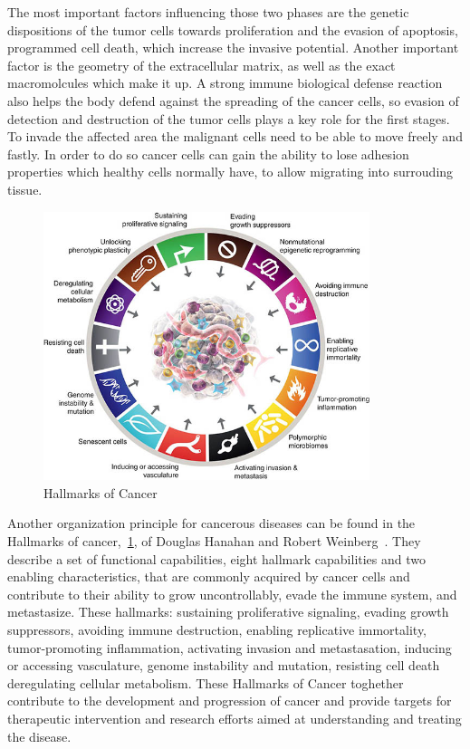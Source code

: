 The most important factors influencing those two phases are the genetic dispositions of the tumor cells towards proliferation and the evasion of apoptosis, programmed cell death, which increase the invasive potential. Another important factor is the geometry of the extracellular matrix, as well as the exact macromolcules which make it up. A strong immune biological defense reaction also helps the body defend against the spreading of the cancer cells, so evasion of detection and destruction of the tumor cells plays a key role for the first stages. To invade the affected area the malignant cells need to be able to move freely and fastly. In order to do so cancer cells can gain the ability to lose adhesion properties which healthy cells normally have, to allow migrating into surrouding tissue. 
\begin{figure}[h]
    \centering
    \includegraphics[width=0.85\textwidth]{resources/images/Hallmarks-of-Cancer.jpg}
    \caption{Hallmarks of Cancer}
    \label{fig:hallmarks_of_cancer}
\end{figure}
Another organization principle for cancerous diseases can be found in the Hallmarks of cancer,~\ref{fig:hallmarks_of_cancer}, of Douglas Hanahan and Robert Weinberg~\cite{10.1158/2159-8290.CD-21-1059}. They describe a set of functional capabilities, eight hallmark capabilities and two enabling characteristics, that are commonly acquired by cancer cells and contribute to their ability to grow uncontrollably, evade the immune system, and metastasize. These hallmarks: sustaining proliferative signaling, evading growth suppressors, avoiding immune destruction, enabling replicative immortality, tumor-promoting inflammation, activating invasion and metastasation, inducing or accessing vasculature, genome instability and mutation, resisting cell death deregulating cellular metabolism. These Hallmarks of Cancer toghether contribute to the development and progression of cancer and provide targets for therapeutic intervention and research efforts aimed at understanding and treating the disease. 
